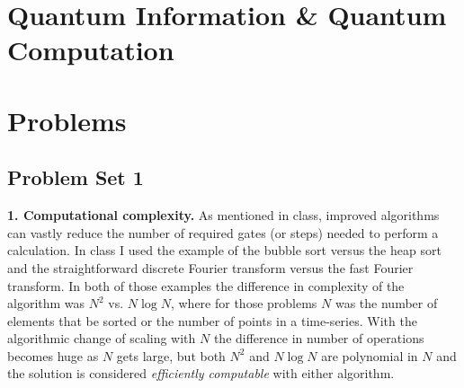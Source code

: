 \documentclass{book}
\theoremstyle{definition}
\begin{document}
\chapter{Quantum Information \& Quantum Computation}
\newpage




\chapter{Problems}

\newpage

\section{Problem Set 1}



\noindent \textbf{1. Computational complexity.}  As mentioned in class, improved algorithms can vastly reduce
the number of required gates (or steps) needed to perform a calculation. In class I used the
example of the bubble sort versus the heap sort and the straightforward discrete Fourier
transform versus the fast Fourier transform. In both of those examples the difference in
complexity of the algorithm was $N^2$ vs. $N \log N$, where for those problems $N$ was the number
of elements that be sorted or the number of points in a time-series. With the algorithmic
change of scaling with $N$ the difference in number of operations becomes huge as $N$ gets
large, but both $N^2$ and $N \log N$ are polynomial in $N$ and the solution is considered \textit{efficiently
computable} with either algorithm.
\\
\end{document}
